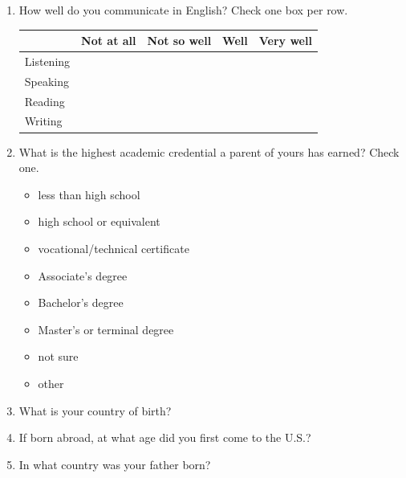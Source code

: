 \documentclass[letterpaper,10pt]{article}
\begin{document}
\begin{enumerate}[resume]
\item How well do you communicate in English? Check one box per row.\\

\renewcommand{\arraystretch}{1.5}
\begin{tabular}{|p{1in}|p{1in}|p{1in}|p{1in}|p{1in}|}
\hline
 & Not at all & Not so well & Well & Very well \\
\hline
Listening & & & & \\
\hline
Speaking & & & & \\
\hline
Reading & & & & \\
\hline
Writing & & & & \\
\hline
\end{tabular}


\item What is the highest academic credential a parent of yours has earned? Check one.
\vspace{-0.1in}\begin{multicols}{2}
\begin{itemize}
	\item less than high school
	\item high school or equivalent
	\item vocational/technical certificate
	\item Associate's degree
	\item Bachelor’s degree
	\item Master's or terminal degree
	\item not sure
	\item other \underline{\hspace{2in}} 
\end{itemize}
\end{multicols}


\item What is your country of birth? \underline{\hspace{2.5in}}\\[0.05in]

\item If born abroad, at what age did you first come to the U.S.? \underline{\hspace{2.5in}}\\[0.05in]

\item In what country was your father born? \underline{\hspace{2.5in}}\\[0.05in]


\end{enumerate}
\end{document}
